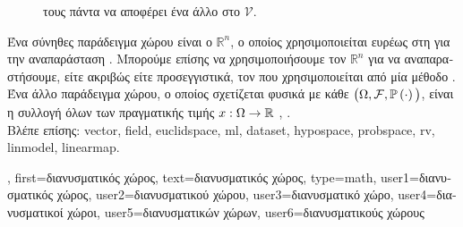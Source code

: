 {{\begin{figure}[H]
{{{			τους πάντα να αποφέρει ένα άλλο}  \foreignlanguage{greek}{στο} $\mathcal{V}$.}
			\label{fig:vector-ops_dict} }
		\end{figure}
		\foreignlanguage{greek}{Ένα σύνηθες παράδειγμα}  \foreignlanguage{greek}{χώρου είναι ο} 
		 $\mathbb{R}^n$, \foreignlanguage{greek}{ο οποίος χρησιμοποιείται ευρέως στη} 
		 \foreignlanguage{greek}{για την αναπαράσταση} . 
		\foreignlanguage{greek}{Μπορούμε επίσης να χρησιμοποιήσουμε τον $\mathbb{R}^n$ για να αναπαραστήσουμε,
		είτε ακριβώς είτε προσεγγιστικά, τον}  \foreignlanguage{greek}{που χρησιμοποιείται
		από μία μέθοδο} . \foreignlanguage{greek}{Ένα άλλο παράδειγμα}  
		\foreignlanguage{greek}{χώρου, ο οποίος σχετίζεται φυσικά με κάθε}  
		$\big(\Omega,\mathcal{F},\mathbb{P}\left(\cdot\right) \big)$, \foreignlanguage{greek}{είναι η συλλογή όλων των} 
		 \foreignlanguage{greek}{πραγματικής τιμής} $x: \Omega \rightarrow \mathbb{R}$ \cite{RudinBook}, \cite{folland1999real}. 
		\\
		\foreignlanguage{greek}{Βλέπε επίσης:} \gls{vector}, \gls{field}, \gls{euclidspace}, \gls{ml}, \gls{dataset}, \gls{hypospace}, \gls{probspace},  
		\gls{rv}, \gls{linmodel}, \gls{linearmap}.},
	first={\foreignlanguage{greek}{διανυσματικός χώρος}},
	text={\foreignlanguage{greek}{διανυσματικός χώρος}},
	type=math,
	user1={\foreignlanguage{greek}{διανυσματικός χώρος}}, %
	user2={\foreignlanguage{greek}{διανυσματικού χώ\-ρου}}, %
	user3={\foreignlanguage{greek}{διανυσματικό χώρο}}, %
	user4={\foreignlanguage{greek}{διανυσματικοί χώροι}}, %
	user5={\foreignlanguage{greek}{διανυσματικών χώρων}}, %
	user6={\foreignlanguage{greek}{διανυσματικούς χώρους}} %
}

